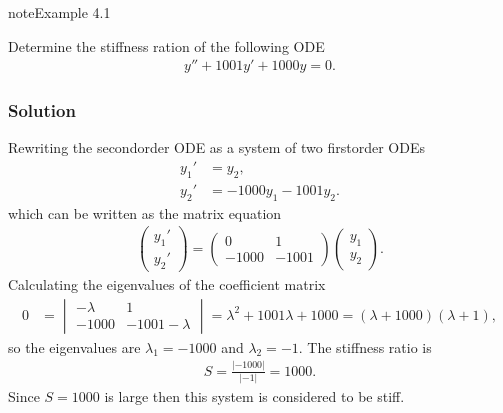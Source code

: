 \documentclass[letterpaper,10pt,english]{jupyterBook}
\begin{document}
\begin{sphinxadmonition}{note}{Example 4.1}

\sphinxAtStartPar
Determine the stiffness ration of the following ODE
\begin{equation*}
\begin{split} y'' + 1001 y' + 1000 y = 0.\end{split}
\end{equation*}\subsubsection*{Solution}

\sphinxAtStartPar
Rewriting the second\sphinxhyphen{}order ODE as a system of two first\sphinxhyphen{}order ODEs
\begin{align*}
    y_1' &= y_2, \\
    y_2' &= -1000 y_1 - 1001 y_2.
\end{align*}
\sphinxAtStartPar
which can be written as the matrix equation
\begin{align*}
    \begin{pmatrix} y_1' \\ y_2' \end{pmatrix} =
    \begin{pmatrix} 0 & 1 \\ -1000 & -1001 \end{pmatrix}
    \begin{pmatrix} y_1 \\ y_2 \end{pmatrix}.
\end{align*}
\sphinxAtStartPar
Calculating the eigenvalues of the coefficient matrix
\begin{align*}
    0 &= \begin{vmatrix} -\lambda & 1 \\ -1000 & -1001 - \lambda \end{vmatrix} 
    = \lambda^2 + 1001 \lambda + 1000 = (\lambda + 1000) (\lambda + 1),
\end{align*}
\sphinxAtStartPar
so the eigenvalues are \(\lambda_1 = -1000\) and \(\lambda_2 = -1\). The stiffness ratio is
\begin{equation*}
\begin{split}S = \frac{|-1000|}{|-1|} = 1000.\end{split}
\end{equation*}
\sphinxAtStartPar
Since \(S = 1000\) is large then this system is considered to be stiff.
\end{sphinxadmonition}
\end{document}
